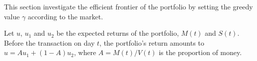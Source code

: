 \documentclass[runningheads]{llncs}
\begin{document}



This section investigate the efficient frontier of the portfolio by setting the greedy value $\gamma$ according to the market.

Let $u$, $u_1$ and $u_2$ be the expected returns of the portfolio, $M(t)$ and $S(t)$. Before the transaction on day $t$, the portfolio's return amounts to $u = Au_1 + (1-A)u_2$, where $A=M(t)/V(t)$ is the proportion of money.
\end{document}
